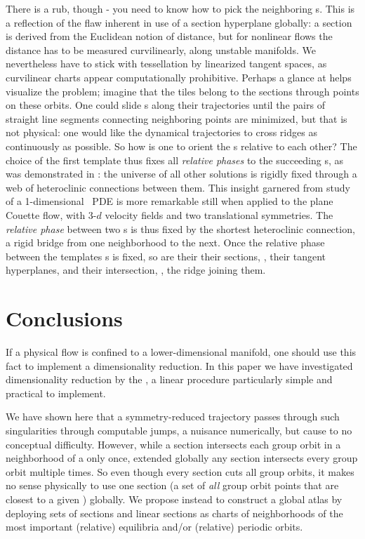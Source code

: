 There is a rub, though - you need to know how to pick the
neighboring {\template s}. This is a reflection of the flaw inherent in use
of a {\Poincare} section hyperplane globally: a {\Poincare} section is derived from the Euclidean
notion of distance, but for nonlinear flows the distance has to be
measured curvilinearly, along unstable
manifolds. We nevertheless have to stick with
tessellation by linearized tangent spaces, as curvilinear charts appear
computationally prohibitive. Perhaps a glance at
 helps visualize the problem; imagine that the
tiles belong to the
{\Poincare} sections through {\template} points on these orbits. One could slide
{\template s} along their trajectories until the pairs of straight line
segments connecting neighboring {\template} points are minimized, but
that is not physical: one would like the dynamical trajectories to cross
ridges as continuously as possible. So how is one to orient
the {\template s} relative to each other? The choice of the first template thus fixes all {\em
relative phases} to the succeeding {\template s}, as was demonstrated in
: the universe of all other solutions is rigidly fixed
through a web of heteroclinic connections between them. This insight
garnered from study of a 1-dimensional \KS\ PDE is more remarkable still
when applied to the plane Couette flow, with 3-$d$ velocity
fields and two translational symmetries. The {\em relative phase} between
two {\template s} is thus fixed  by the shortest heteroclinic connection,
a rigid bridge from one neighborhood to the next. Once the relative phase
between the templates {\template s} is fixed, so are their their {\Poincare} sections,
\ie, their tangent hyperplanes, and their intersection, \ie, the  ridge
joining them.


\section{Conclusions}
    \label{sec:concl}

If a physical flow is confined to a lower-dimensional manifold, one should
use this fact to implement a dimensionality reduction.  In this
paper we have investigated dimensionality reduction by the \mslices, a linear
procedure particularly simple and practical to implement.

We have shown here that a symmetry-reduced trajectory passes through such
singularities through computable jumps, a nuisance numerically, but cause
to no conceptual difficulty. However, while a {\Poincare} section intersects each group
orbit in a neighborhood of a {\template} only once, extended globally any
{\Poincare} section intersects every group orbit multiple times. So even though every
{\Poincare} section cuts all group orbits, it makes no sense physically to use one
{\Poincare} section (a set of \emph{all} group orbit points that are closest to a given
{\template}) globally. We propose instead to construct a global atlas by
deploying sets of {\Poincare} sections and linear {\Poincare} sections as charts of
neighborhoods of the most important (relative) equilibria and/or
(relative) periodic orbits.

